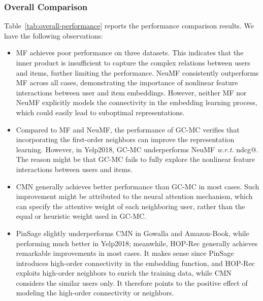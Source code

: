 \documentclass[sigconf]{acmart}
\newcommand{\wrt}{\emph{w.r.t. }}
\theoremstyle{definition}
\begin{document}
\subsubsection{\textbf{Overall Comparison}}
Table~\ref{tab:overall-performance} reports the performance comparison results.
We have the following observations:
\begin{itemize}[leftmargin=*]
\item MF achieves poor performance on three datasets. This indicates that the inner product is insufficient to capture the complex relations between users and items, further limiting the performance.
NeuMF consistently outperforms MF across all cases, demonstrating the importance of nonlinear feature interactions between user and item embeddings.
However, neither MF nor NeuMF explicitly models the connectivity in the embedding learning process, which could easily lead to suboptimal representations.

\item Compared to MF and NeuMF, the performance of GC-MC verifies that incorporating the first-order neighbors can improve the representation learning.
However, in Yelp2018, GC-MC underperforms NeuMF \wrt ndcg@.
The reason might be that GC-MC fails to fully explore the nonlinear feature interactions between users and items.




\item CMN generally achieves better performance than GC-MC in most cases.
Such improvement might be attributed to the neural attention mechanism, which can specify the attentive weight of each neighboring user, rather than the equal or heuristic weight used in GC-MC.

\item PinSage slightly underperforms CMN in Gowalla and Amazon-Book, while performing much better in Yelp2018;
meanwhile, HOP-Rec generally achieves remarkable improvements in most cases.
It makes sense since PinSage introduces high-order connectivity in the embedding function, and HOP-Rec exploits high-order neighbors to enrich the training data, while CMN considers the similar users only.
It therefore points to the positive effect of modeling the high-order connectivity or neighbors.


\end{itemize}
\end{document}
